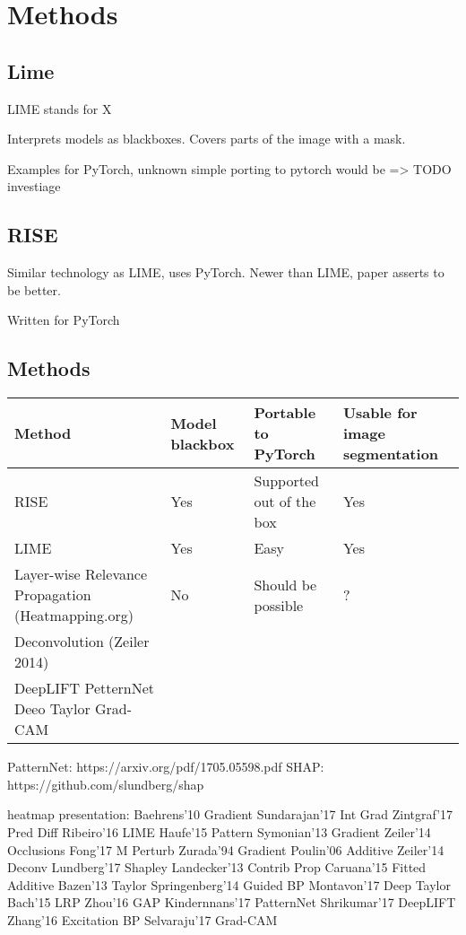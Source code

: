 \chapter{Methods}
\section{Lime}
LIME\cite{todo} stands for X

Interprets models as blackboxes. Covers parts of the image with a mask.

Examples for PyTorch, unknown simple porting to pytorch would be => TODO investiage


\section{RISE}
Similar technology as LIME, uses PyTorch. Newer than LIME, paper asserts to be better.

Written for PyTorch





\section{Methods}

\begin{tabular}{|l|l|l|l|}
\hline
 \textbf{Method} & \textbf{Model blackbox} & \textbf{Portable to PyTorch} & \textbf{Usable for image segmentation} \\ \hline
 RISE & Yes & Supported out of the box & Yes\\ \hline
 LIME & Yes & Easy & Yes \\ \hline
 Layer-wise Relevance Propagation (Heatmapping.org) & No & Should be possible & ? \\ \hline
 Deconvolution (Zeiler 2014) \\ \hline
 DeepLIFT
 PetternNet
 Deeo Taylor
 Grad-CAM
 
\end{tabular}

PatternNet: https://arxiv.org/pdf/1705.05598.pdf
SHAP: https://github.com/slundberg/shap

heatmap presentation:
Baehrens'10 Gradient
Sundarajan'17 Int Grad
Zintgraf'17 Pred Diff
Ribeiro'16 LIME
Haufe'15 Pattern
Symonian'13 Gradient
Zeiler'14 Occlusions
Fong'17 M Perturb
Zurada'94 Gradient
Poulin'06 Additive
Zeiler'14 Deconv
Lundberg'17 Shapley
Landecker'13 Contrib Prop
Caruana'15 Fitted Additive
Bazen'13 Taylor
Springenberg'14 Guided BP
Montavon'17 Deep Taylor
Bach'15 LRP
Zhou'16 GAP
Kindernnans'17 PatternNet
Shrikumar'17 DeepLIFT
Zhang'16 Excitation BP
Selvaraju'17 Grad-CAM

